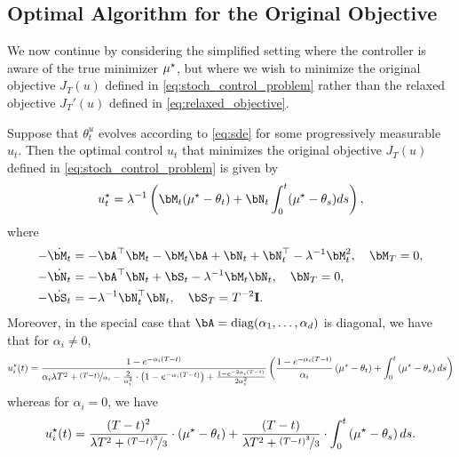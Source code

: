 \subsection{Optimal Algorithm for the Original Objective}\label{app:original_objective}

We now continue by considering the simplified setting where the controller is aware of the true minimizer $\mu^{\star}$, but where we wish to minimize the original objective $J_T(u)$ defined in \eqref{eq:stoch_control_problem} rather than the relaxed objective $J_T'(u)$ defined in \eqref{eq:relaxed_objective}.

\begin{theorem}\label{thm:original_objective}
    Suppose that $\theta_t^u$ evolves according to \eqref{eq:sde} for some progressively measurable $u_t$.  Then the optimal control $u_t$ that minimizes the original objective $J_T(u)$ defined in \eqref{eq:stoch_control_problem} is given by
    \begin{align}
        \ustar_t =  \lambda^{-1} \left( \bM_t (\mustar - \theta_t) + \bN_t \int_0^t (\mustar - \theta_s) d s \right),
    \end{align}
    where
    \begin{align}
        - \dot{\bM_t} &= - \bA^\top \bM_t - \bM_t \bA + \bN_t + \bN_t^\top - \lambda^{-1} \bM_t^2, \quad \bM_T = 0, \\
        - \dot{\bN_t} &= - \bA^\top \bN_t + \bS_t - \lambda^{-1} \bM_t \bN_t, \quad \bN_T = 0, \\
        - \dot{\bS_t} &= - \lambda^{-1} \bN_t^\top \bN_t, \quad \bS_T = T^{-2} \eye.
    \end{align}
    Moreover, in the special case that $\bA = \diag(\alpha_1, \dots, \alpha_d)$ is diagonal, we have that for $\alpha_i \neq 0$, 
    \begin{align}\label{eq:optimal_controller_diagonal_nonzero}
        u^{\star}_i(t) = \frac{1 - e^{- \alpha_i (T - t)}}{\alpha_i \lambda T^2 + \nicefrac{(T - t)}{\alpha_i} - \frac{2}{\alpha_i^2} \cdot \left( 1 - e^{- \alpha_i (T - t)} \right) + \frac{1 - e^{- 2 \alpha_i (T - t)}}{2 \alpha_i^2}} \left( \frac{1 - e^{- \alpha_i (T -t)}}{\alpha_i} \left( \mu^{\star} - \theta_t \right) + \int_0^t \left( \mu^{\star} - \theta_s \right) d s\right)
    \end{align}
    whereas for $\alpha_i = 0$, we have
    \begin{align}\label{eq:optimal_controller_diagonal_zero}
        u^{\star}_i(t) = \frac{(T - t)^2}{\lambda T^2 + \nicefrac{(T - t)^3}{3}} \cdot \left( \mu^{\star} - \theta_t \right) + \frac{(T - t)}{\lambda T^2 + \nicefrac{(T - t)^3}{3}} \cdot \int_0^t \left( \mu^{\star} - \theta_s \right) d s.
    \end{align}

\end{theorem}

